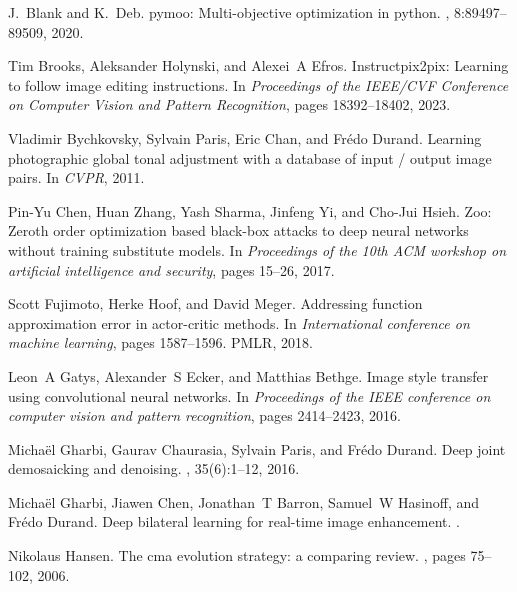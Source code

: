 \documentclass{article}
\begin{document}
\begin{thebibliography}{10}

J.~{Blank} and K.~{Deb}.
\newblock pymoo: Multi-objective optimization in python.
, 8:89497--89509, 2020.

Tim Brooks, Aleksander Holynski, and Alexei~A Efros.
\newblock Instructpix2pix: Learning to follow image editing instructions.
\newblock In {\em Proceedings of the IEEE/CVF Conference on Computer Vision and Pattern Recognition}, pages 18392--18402, 2023.

Vladimir Bychkovsky, Sylvain Paris, Eric Chan, and Fr{\'e}do Durand.
\newblock Learning photographic global tonal adjustment with a database of input / output image pairs.
\newblock In {\em CVPR}, 2011.

Pin-Yu Chen, Huan Zhang, Yash Sharma, Jinfeng Yi, and Cho-Jui Hsieh.
\newblock Zoo: Zeroth order optimization based black-box attacks to deep neural networks without training substitute models.
\newblock In {\em Proceedings of the 10th ACM workshop on artificial intelligence and security}, pages 15--26, 2017.

Scott Fujimoto, Herke Hoof, and David Meger.
\newblock Addressing function approximation error in actor-critic methods.
\newblock In {\em International conference on machine learning}, pages 1587--1596. PMLR, 2018.

Leon~A Gatys, Alexander~S Ecker, and Matthias Bethge.
\newblock Image style transfer using convolutional neural networks.
\newblock In {\em Proceedings of the IEEE conference on computer vision and pattern recognition}, pages 2414--2423, 2016.

Micha{\"e}l Gharbi, Gaurav Chaurasia, Sylvain Paris, and Fr{\'e}do Durand.
\newblock Deep joint demosaicking and denoising.
, 35(6):1--12, 2016.

Micha{\"e}l Gharbi, Jiawen Chen, Jonathan~T Barron, Samuel~W Hasinoff, and Fr{\'e}do Durand.
\newblock Deep bilateral learning for real-time image enhancement.
.

Nikolaus Hansen.
\newblock The cma evolution strategy: a comparing review.
, pages 75--102, 2006.


\end{thebibliography}
\end{document}

